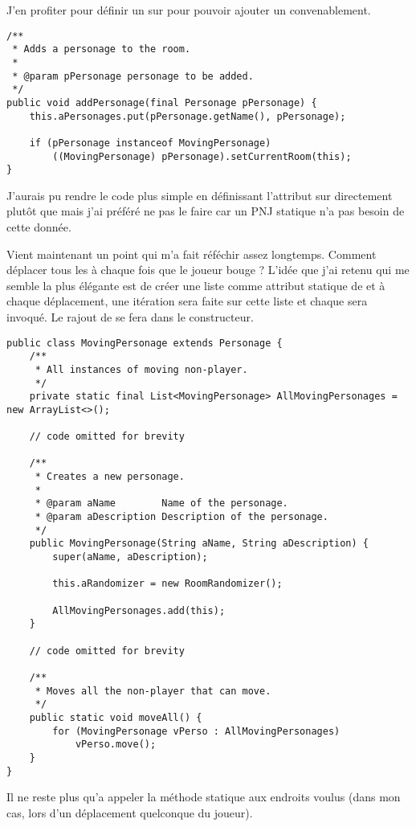 \begin{exercise}[subtitle=Moving character]
J'en profiter pour définir un  sur  pour pouvoir ajouter un  convenablement.

\begin{verbatim}
/**
 * Adds a personage to the room.
 *
 * @param pPersonage personage to be added.
 */
public void addPersonage(final Personage pPersonage) {
    this.aPersonages.put(pPersonage.getName(), pPersonage);

    if (pPersonage instanceof MovingPersonage)
        ((MovingPersonage) pPersonage).setCurrentRoom(this);
}
\end{verbatim}

J'aurais pu rendre le code plus simple en définissant l'attribut  sur  directement plutôt que  mais j'ai préféré ne pas le faire car un PNJ statique n'a pas besoin de cette donnée.

Vient maintenant un point qui m'a fait réféchir assez longtemps. Comment déplacer tous les  à chaque fois que le joueur bouge ? L'idée que j'ai retenu qui me semble la plus élégante est de créer une liste  comme attribut statique de  et à chaque déplacement, une itération sera faite sur cette liste et chaque  sera invoqué. Le rajout de  se fera dans le constructeur.

\begin{verbatim}
public class MovingPersonage extends Personage {
    /**
     * All instances of moving non-player.
     */
    private static final List<MovingPersonage> AllMovingPersonages = new ArrayList<>();

    // code omitted for brevity

    /**
     * Creates a new personage.
     *
     * @param aName        Name of the personage.
     * @param aDescription Description of the personage.
     */
    public MovingPersonage(String aName, String aDescription) {
        super(aName, aDescription);

        this.aRandomizer = new RoomRandomizer();

        AllMovingPersonages.add(this);
    }

    // code omitted for brevity

    /**
     * Moves all the non-player that can move.
     */
    public static void moveAll() {
        for (MovingPersonage vPerso : AllMovingPersonages)
            vPerso.move();
    }
}
\end{verbatim}

Il ne reste plus qu'a appeler la méthode statique  aux endroits voulus (dans mon cas, lors d'un déplacement quelconque du joueur).

\end{exercise}

